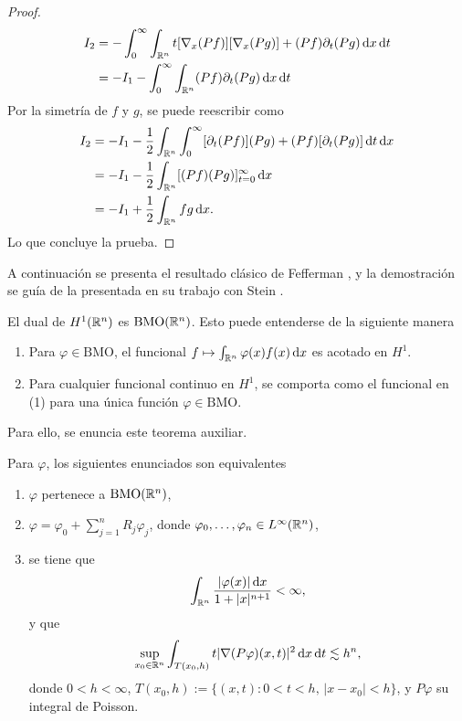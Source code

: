 \begin{proof}
	\begin{align*}
		I_2 & = - \int_0^\infty \int_{\mathbb{R}^n}   t [\nabla_x(Pf)][\nabla_x(Pg)]+(Pf)\partial_t(Pg)\mathop{}\!\mathrm{d} x \mathop{}\!\mathrm{d} t \\
		& = -I_1 - \int_0^\infty \int_{\mathbb{R}^n} (Pf)\partial_t(Pg)\mathop{}\!\mathrm{d} x \mathop{}\!\mathrm{d} t 
	\end{align*}
	Por la simetría de $f$ y $g$, se puede reescribir como 
	\begin{align*}
		I_2 & =  - I_1 -\frac{1}{2}\int_{\mathbb{R}^n}  \int_0^\infty [\partial_t(Pf)](Pg) + (Pf)[\partial_t(Pg)]\mathop{}\!\mathrm{d} t \mathop{}\!\mathrm{d} x \\
		& =  - I_1 -\frac{1}{2}\int_{\mathbb{R}^n} [(Pf)(Pg)]_{t=0}^\infty \mathop{}\!\mathrm{d} x \\
		&= -I_1 + \frac{1}{2}\int_{\mathbb{R}^n}fg\mathop{}\!\mathrm{d} x.
	\end{align*}
	Lo que concluye la prueba.
\end{proof}
A continuación se presenta el resultado clásico de Fefferman \cite{fefferman-BMO}, y la demostración se guía de la presentada en su trabajo con Stein \cite{fefferman-stein}.
\begin{theorem}[Fefferman]\label{theo:H1-BMO}
	El dual de $H^1(\mathbb{R}^n)$ es $\mathrm{BMO}(\mathbb{R}^n)$. Esto puede entenderse de la siguiente manera 
	\begin{enumerate}
		\item Para $\varphi \in \mathrm{BMO}$, el funcional $f\mapsto\int_{\mathbb{R}^n}\varphi(x) f(x)\mathop{}\!\mathrm{d} x$ es acotado en $H^1$.
		\item Para cualquier funcional continuo en $H^1$, se comporta como el funcional en (1) para una única función $\varphi \in \mathrm{BMO}$.
	\end{enumerate}
\end{theorem}
Para ello, se enuncia este teorema auxiliar.
\begin{theorem}\label{theo:BMO-aux}
	Para $\varphi$, los siguientes enunciados son equivalentes
	\begin{enumerate}
		\item $\varphi$ pertenece a $\mathrm{BMO}(\mathbb{R}^n)$,
		\item $\varphi = \varphi_0 + \sum_{j=1}^n R_j\varphi_j$, donde $\varphi_0,\ldots,\varphi_n \in L^\infty(\mathbb{R}^n)$,
		\item se tiene que
		\begin{equation*}
			\int_{\mathbb{R}^n}\frac{|\varphi(x)|\mathop{}\!\mathrm{d} x}{1+|x|^{n+1}} < \infty, 
		\end{equation*}
		y que 
		\begin{equation*}
			\sup_{x_0\in\mathbb{R}^n}\int_{T(x_0, h)} t|\nabla (P\varphi)(x, t)|^2\mathop{}\!\mathrm{d} x \mathop{}\!\mathrm{d} t \lesssim h^n,
		\end{equation*}
		donde $0<h<\infty$, $T(x_0, h) := \{(x, t): 0<t<h, \, |x-x_0| < h\}$, y $P\varphi$ su integral de Poisson.
	\end{enumerate}
\end{theorem}
